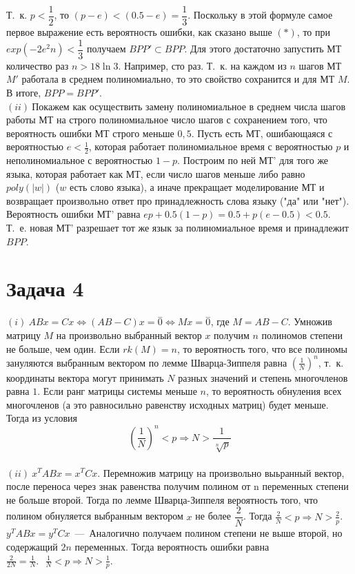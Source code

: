 \documentclass[a4paper,12pt]{article} %
\begin{document}
Т.~к. $p<\dfrac{1}{2}$, то $(p-e)<(0.5-e)=\dfrac{1}{3}$. Поскольку в этой формуле самое первое выражение есть вероятность ошибки, как сказано выше $(*)$, то при $exp(-2e^2n) < \dfrac{1}{3}$ получаем $BPP' \subset BPP$. Для этого достаточно запустить МТ количество раз $n > 18\ln{3}$. Например, сто раз. Т.~к.  на каждом из $n$ шагов МТ $M'$ работала в среднем полиномиально, то это свойство сохранится и для МТ $M$.\\
В итоге, $BPP = BPP'$.\\

$(ii)~$Покажем как осуществить замену полиномиальное в среднем числа шагов работы МТ на строго полиномиальное число шагов с сохранением того, что вероятность ошибки МТ строго меньше $0,5$. Пусть есть МТ, ошибающаяся с вероятностью $e < \frac{1}{2}$, которая работает полиномиальное время с вероятностью $p$ и неполиномиальное с вероятностью $1-p$. Построим по ней МТ' для того же языка, которая работает как МТ, если число шагов меньше либо равно $poly(|w|)$ ($w$ есть слово языка), а иначе прекращает моделирование МТ и возвращает произвольно ответ про принадлежность слова языку ("да" или "нет"). Вероятность ошибки МТ' равна $ep+0.5(1-p) = 0.5+p(e-0.5) < 0.5$. Т.~е. новая МТ' разрешает тот же язык за полиномиальное время и принадлежит $BPP$.\\

\section*{Задача 4}
$(i)~ABx = Cx \Leftrightarrow (AB - C)x = \overset{-}0 \Leftrightarrow Mx = \overset{-}0$, где $M = AB - C$. Умножив матрицу $M$ на произвольно выбранный вектор $x$ получим $n$ полиномов степени не больше, чем один. Если $rk (M) = n$, то вероятность того, что все полиномы зануляются выбранным вектором по лемме Шварца-Зиппеля равна $ \left(\frac{1}{N}\right)^n$, т.~к. координаты вектора могут принимать $N$ разных значений и степень многочленов равна $1$. Если ранг матрицы системы меньше $n$, то вероятность обнуления всех многочленов (а это равносильно равенству исходных матриц) будет меньше. Тогда из условия \[ \left(\frac{1}{N}\right)^n < p \Rightarrow N > \dfrac{1}{\sqrt[n]{p}}\]\\
$(ii)~x^TABx = x^TCx$. Перемножив матрицу на произвольно выьранный вектор, после переноса через знак равенства получим полином от n переменных степени не больше второй. Тогда по лемме Шварца-Зиппеля вероятность того, что полином обнуляется выбранным вектором $x$  не более $\dfrac{2}{N}$. Тогда  $\frac{2}{N} < p \Rightarrow N >\frac{2}{p}$. \\
$y^TABx = y^TCx$~---~Аналогично получаем полином степени не выше второй, но содержащий $2n$ переменных. Тогда вероятность ошибки равна $\frac{2}{2N} = \frac{1}{N}.~~~ \frac{1}{N} < p \Rightarrow N > \frac{1}{p}$.
\end{document}
